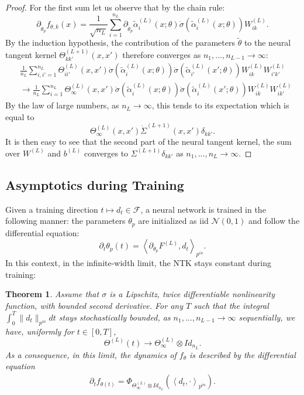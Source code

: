 \documentclass{article}
\newtheorem{thm}{Theorem}
\begin{document}
\begin{proof}
For the first sum let us observe that by the chain rule:
$$
\partial_{\tilde{\theta}_p} f_{\theta, k}(x) = \frac{1}{\sqrt{n_L}} \sum_{i=1}^{n_L} \partial_{\tilde{\theta}_p} \tilde{\alpha}^{(L)}_{i}(x;\theta) \dot{\sigma}(\tilde{\alpha}^{(L)}_i(x;\theta)) W^{(L)}_{ik}.
$$
By the induction hypothesis, the contribution of the parameters $\tilde{\theta}$ to the neural tangent kernel $\Theta^{(L+1)}_{kk'}(x, x')$ therefore converges as $n_1, ..., n_{L-1} \to \infty$:
\begin{align*}
    &\frac{1}{n_L}\! \sum_{i, i'=1}^{n_L}\! \Theta^{(L)}_{ii'}(x, x') \dot{\sigma}\!\left(\!\tilde{\alpha}^{(L)}_i(x;\theta)\!\right) \dot{\sigma}\!\left(\!\tilde{\alpha}^{(L)}_{i'}(x';\theta)\!\right) W^{(L)}_{ik}W^{(L)}_{i'k'} \\
    &\!\to \frac{1}{n_L}\!\sum_{i=1}^{n_L}\! \Theta^{(L)}_\infty(x, x') \dot{\sigma}\!\left(\!\tilde{\alpha}^{(L)}_i(x;\theta)\!\right) \dot{\sigma}\!\left(\!\tilde{\alpha}^{(L)}_i(x';\theta)\!\right) W^{(L)}_{ik}W^{(L)}_{ik'}
\end{align*}
By the law of large numbers, as $n_L \to \infty$, this tends to its expectation which is equal to
$$
\Theta^{(L)}_\infty(x, x') \dot{\Sigma}^{(L+1)}(x, x') \delta_{kk'}.
$$
It is then easy to see that the second part of the neural tangent kernel, the sum over $W^{(L)}$ and $b^{(L)}$ converges to $\Sigma^{(L+1)} \delta_{kk'}$ as $n_1, ..., n_L \to \infty$.
\end{proof}

\subsection{Asymptotics during Training}
Given a training direction $t \mapsto d_t \in \mathcal{F}$, a neural network is trained in the following manner: the parameters $\theta_p$ are initialized as iid $\mathcal{N}(0, 1)$ and follow the differential equation:
$$
\partial_t \theta_p(t) = \left< \partial_{\theta_p} F^{(L)}, d_t \right>_{p^{in}}.
$$
In this context, in the infinite-width limit, the NTK stays constant during training:

\begin{thm}\label{thm:conv-ntk-training}
Assume that $ \sigma $ is a Lipschitz, twice differentiable nonlinearity function, with bounded second derivative. For any $T$ such that the integral $\int_0^T \| d_t \|_{p^{in}} dt$ stays stochastically bounded, as  $n_1, ..., n_{L-1} \to \infty$ sequentially, we have, uniformly for $t\in[0, T]$,
$$
\Theta^{(L)}(t) \to \Theta^{(L)}_\infty \otimes Id_{n_L}.
$$
As a consequence, in this limit, the dynamics of $f_\theta$ is described by the differential equation
\begin{align*}
    \partial_t f_{\theta(t)} = \Phi_{\Theta^{(L)}_\infty \otimes Id_{n_L}} \left( \left<d_{t}, \cdot \right>_{p^{in}} \right).
\end{align*}
\end{thm}
\end{document}
